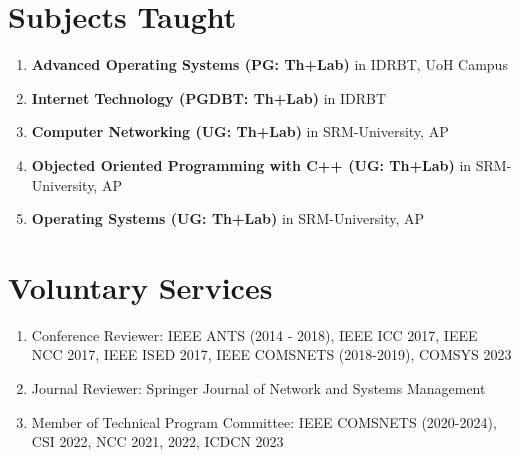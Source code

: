 \documentclass{article}
\begin{document}
\section{Subjects Taught}	
	\begin{enumerate}
	 \item {\bf Advanced Operating Systems (PG: Th+Lab)} in IDRBT, UoH Campus
	 \item {\bf Internet Technology (PGDBT: Th+Lab)} in IDRBT
	 \item {\bf Computer Networking (UG: Th+Lab)} in SRM-University, AP
	 \item {\bf Objected Oriented Programming with C++ (UG: Th+Lab)} in SRM-University, AP	 
	 \item {\bf Operating Systems (UG: Th+Lab)} in SRM-University, AP
	\end{enumerate}
\begin{comment}
\section{Teaching Assistance}	
	\begin{enumerate}
	 \item {\bf Teaching Assistant} in IIT, Guwahati For Operating Systems (CS341) (2018 Monsoon)
	 \item {\bf Teaching Assistant} in IIT, Guwahati For Network Lab (CS343) (2016 Monsoon)
	 \item {\bf Teaching Assistant} in IIT, Guwahati For Wireless Networks (CS551) (2015 Monsoon, 2017 Monsoon)
	 \item {\bf Teaching Assistant} in IIT, Guwahati For Systems Lab (CS558) (2014 Winter,2015 Winter,2016 Winter,2018 Winter)
	 \item {\bf Teaching Assistant} in IIT, Guwahati For Programming Lab (CS513) (2013 Monsoon, 2014 Monsoon)
	 \item {\bf Teaching Assistant} in IIT, Guwahati For Computing Laboratory (CS110) (2013 Winter)
	 \item {\bf Teaching Assistant} in IIT, Guwahati For Discrete Mathematics (CS202)  (2012 Monsoon)
	\end{enumerate}
\end{comment}
\section{Voluntary Services}
  \begin{enumerate}
   \item Conference Reviewer: IEEE ANTS (2014 - 2018), IEEE ICC 2017, IEEE NCC 2017, IEEE ISED 2017, IEEE COMSNETS (2018-2019), COMSYS 2023
   \item Journal Reviewer: Springer Journal of Network and Systems Management
   \item Member of Technical Program Committee: IEEE  COMSNETS (2020-2024), CSI 2022, NCC 2021, 2022, ICDCN 2023
  \end{enumerate}
\end{document}
